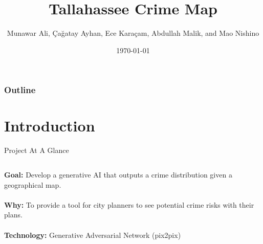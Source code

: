 \documentclass{beamer}
\title{Tallahassee Crime Map}
\author{Munawar Ali, Çağatay Ayhan, Ece Karaçam, Abdullah Malik, and Mao Nishino}
\date{\today}
\begin{document}
\begin{frame}
    \titlepage
\end{frame}


\begin{frame}
    \frametitle{Outline}
    \tableofcontents
\end{frame}


\section{Introduction}
\begin{frame}{Project At A Glance}

    \begin{columns}[T] %

        \begin{column}{.5\textwidth}
            \textbf{Goal:} Develop a generative AI that outputs a crime distribution given a geographical map.\\
            \quad \\
            \textbf{Why:} To provide a tool for city planners to see potential crime risks with their plans.\\
            \quad \\
            \textbf{Technology:} Generative Adversarial Network (pix2pix)
        \end{column}


\end{columns}
\end{frame}
\end{document}
